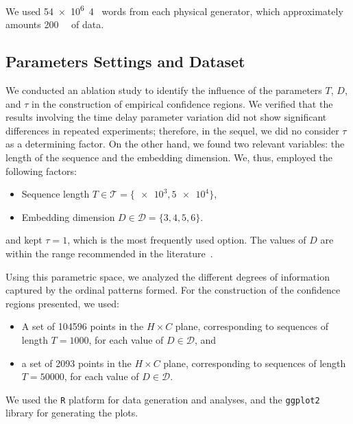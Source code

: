 \documentclass[alpha-refs]{wiley-article}
\begin{document}
We used \SI{54e6}{4\byte} words from each physical generator, which approximately amounts \SI{200}{\mega\byte} of data.


\subsection{Parameters Settings and Dataset}\label{Sec:Parameters}

We conducted an ablation study to identify the influence of the parameters $T$, $D$, and $\tau$ in the construction of empirical confidence regions.
We verified that the results involving the time delay parameter variation did not show significant differences in repeated experiments; therefore, in the sequel, we did no consider $\tau$ as a determining factor.
On the other hand, we found two relevant variables: 
the length of the sequence 
and the embedding dimension.
We, thus, employed the following factors:
\begin{itemize}
	\item Sequence length $T\in\mathcal T=\{ \num[scientific-notation=true]{e3}, \num[scientific-notation=true]{5 e4}\}$,
	\item Embedding dimension $D\in\mathcal D=\{3, 4, 5, 6\}$.
\end{itemize}
and kept $\tau=1$, which is the most frequently used option.
The values of $D$ are within the range recommended in the literature~\citep{PermutationEntropyBandtPompe}.

Using this parametric space, we analyzed the different degrees of information captured by the ordinal patterns formed.
For the construction of the confidence regions presented, we used:
\begin{itemize}
	\item A set of \num{104596} points in the $H \times C$ plane, corresponding to sequences of length $T = 1000$, for each value of $D\in \mathcal D$, and
	\item  a set of \num{2093} points in the $H \times C$ plane, corresponding to sequences of length $T = 50000$, for each value of $D \in \mathcal D$.
\end{itemize}

We used the \texttt R platform \citep[][v.~4.0.3]{Rmanual} for data generation and analyses, and the \texttt{ggplot2} library \cite{ggplot2Wickman} for generating the plots.
\end{document}

